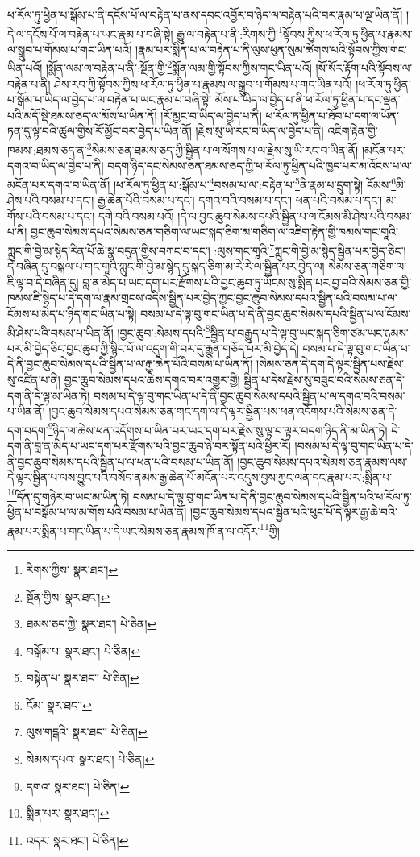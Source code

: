 ཕ་རོལ་ཏུ་ཕྱིན་པ་སྒོམ་པ་ནི་དངོས་པོ་ལ་བརྟེན་པ་ནས་དབང་འབྱོར་བ་ཉིད་ལ་བརྟེན་པའི་བར་རྣམ་པ་ལྔ་ཡིན་ནོ། །དེ་ལ་དངོས་པོ་ལ་བརྟེན་པ་ཡང་རྣམ་པ་བཞི་སྟེ། རྒྱུ་ལ་བརྟེན་པ་ནི་:རིགས་ཀྱི་\footnote{རིགས་ཀྱིས་  སྣར་ཐང་། }སྟོབས་ཀྱིས་ཕ་རོལ་ཏུ་ཕྱིན་པ་རྣམས་ལ་སྒྲུབ་པ་གོམས་པ་གང་ཡིན་པའོ། །རྣམ་པར་སྨིན་པ་ལ་བརྟེན་པ་ནི་ལུས་ཕུན་སུམ་ཚོགས་པའི་སྟོབས་ཀྱིས་གང་ཡིན་པའོ། །སྨོན་ལམ་ལ་བརྟེན་པ་ནི་:སྔོན་གྱི་\footnote{སྔོན་གྱིས་  སྣར་ཐང་། }སྨོན་ལམ་གྱི་སྟོབས་ཀྱིས་གང་ཡིན་པའོ། །སོ་སོར་རྟོག་པའི་སྟོབས་ལ་བརྟེན་པ་ནི། ཤེས་རབ་ཀྱི་སྟོབས་ཀྱིས་ཕ་རོལ་ཏུ་ཕྱིན་པ་རྣམས་ལ་སྒྲུབ་པ་གོམས་པ་གང་ཡིན་པའོ། །ཕ་རོལ་ཏུ་ཕྱིན་པ་སྒོམ་པ་ཡིད་ལ་བྱེད་པ་ལ་བརྟེན་པ་ཡང་རྣམ་པ་བཞི་སྟེ། མོས་པ་ཡིད་ལ་བྱེད་པ་ནི་ཕ་རོལ་ཏུ་ཕྱིན་པ་དང་ལྡན་པའི་མདོ་སྡེ་ཐམས་ཅད་ལ་མོས་པ་ཡིན་ནོ། །རོ་མྱང་བ་ཡིད་ལ་བྱེད་པ་ནི། ཕ་རོལ་ཏུ་ཕྱིན་པ་ཐོབ་པ་དག་ལ་ཡོན་ཏན་དུ་ལྟ་བའི་ཚུལ་གྱིས་རོ་མྱོང་བར་བྱེད་པ་ཡིན་ནོ། །རྗེས་སུ་ཡི་རང་བ་ཡིད་ལ་བྱེད་པ་ནི། འཇིག་རྟེན་གྱི་ཁམས་:ཐམས་ཅད་ན་\footnote{ཐམས་ཅད་ཀྱི་  སྣར་ཐང་།  པེ་ཅིན། }སེམས་ཅན་ཐམས་ཅད་ཀྱི་སྦྱིན་པ་ལ་སོགས་པ་ལ་རྗེས་སུ་ཡི་རང་བ་ཡིན་ནོ། །མངོན་པར་དགའ་བ་ཡིད་ལ་བྱེད་པ་ནི། བདག་ཉིད་དང་སེམས་ཅན་ཐམས་ཅད་ཀྱི་ཕ་རོལ་ཏུ་ཕྱིན་པའི་ཁྱད་པར་མ་འོངས་པ་ལ་མངོན་པར་དགའ་བ་ཡིན་ནོ། །ཕ་རོལ་ཏུ་ཕྱིན་པ་:སྒོམ་པ་\footnote{བསྒོམ་པ་  སྣར་ཐང་།  པེ་ཅིན། }བསམ་པ་ལ་:བརྟེན་པ་\footnote{བསྟེན་པ་  སྣར་ཐང་།  པེ་ཅིན། }ནི་རྣམ་པ་དྲུག་སྟེ། ངོམས་\footnote{ངོམ་  སྣར་ཐང་། }མི་ཤེས་པའི་བསམ་པ་དང་། རྒྱ་ཆེན་པོའི་བསམ་པ་དང་། དགའ་བའི་བསམ་པ་དང་། ཕན་པའི་བསམ་པ་དང་། མ་གོས་པའི་བསམ་པ་དང་། དགེ་བའི་བསམ་པའོ། །དེ་ལ་བྱང་ཆུབ་སེམས་དཔའི་སྦྱིན་པ་ལ་ངོམས་མི་ཤེས་པའི་བསམ་པ་ནི། བྱང་ཆུབ་སེམས་དཔའ་སེམས་ཅན་གཅིག་ལ་ཡང་སྐད་ཅིག་མ་གཅིག་ལ་འཇིག་རྟེན་གྱི་ཁམས་གང་གཱའི་ཀླུང་གི་བྱེ་མ་སྙེད་རིན་པོ་ཆེ་སྣ་བདུན་གྱིས་བཀང་བ་དང་། :ལུས་གང་གཱའི་\footnote{ལུས་གངྒའི་  སྣར་ཐང་།  པེ་ཅིན། }ཀླུང་གི་བྱེ་མ་སྙེད་སྦྱིན་པར་བྱེད་ཅིང་། དེ་བཞིན་དུ་བསྐལ་པ་གང་གཱའི་ཀླུང་གི་བྱེ་མ་སྙེད་དུ་སྐད་ཅིག་མ་རེ་རེ་ལ་སྦྱིན་པར་བྱེད་ལ། སེམས་ཅན་གཅིག་ལ་ཇི་ལྟ་བ་དེ་བཞིན་དུ། བླ་ན་མེད་པ་ཡང་དག་པར་རྫོགས་པའི་བྱང་ཆུབ་ཏུ་ཡོངས་སུ་སྨིན་པར་བྱ་བའི་སེམས་ཅན་གྱི་ཁམས་ཇི་སྙེད་པ་དེ་དག་ལ་རྣམ་གྲངས་འདིས་སྦྱིན་པར་བྱེད་ཀྱང་བྱང་ཆུབ་སེམས་དཔའ་སྦྱིན་པའི་བསམ་པ་ལ་ངོམས་པ་མེད་པ་ཉིད་གང་ཡིན་པ་སྟེ། བསམ་པ་དེ་ལྟ་བུ་གང་ཡིན་པ་དེ་ནི་བྱང་ཆུབ་སེམས་དཔའི་སྦྱིན་པ་ལ་ངོམས་མི་ཤེས་པའི་བསམ་པ་ཡིན་ནོ། །བྱང་ཆུབ་:སེམས་དཔའི་\footnote{སེམས་དཔའ་  སྣར་ཐང་།  པེ་ཅིན། }སྦྱིན་པ་བརྒྱུད་པ་དེ་ལྟ་བུ་ཡང་སྐད་ཅིག་ཙམ་ཡང་ཉམས་པར་མི་བྱེད་ཅིང་བྱང་ཆུབ་ཀྱི་སྙིང་པོ་ལ་འདུག་གི་བར་དུ་རྒྱུན་གཅོད་པར་མི་བྱེད་དེ། བསམ་པ་དེ་ལྟ་བུ་གང་ཡིན་པ་དེ་ནི་བྱང་ཆུབ་སེམས་དཔའི་སྦྱིན་པ་ལ་རྒྱ་ཆེན་པོའི་བསམ་པ་ཡིན་ནོ། །སེམས་ཅན་དེ་དག་དེ་ལྟར་སྦྱིན་པས་རྗེས་སུ་འཛིན་པ་ནི། བྱང་ཆུབ་སེམས་དཔའ་ཆེས་དགའ་བར་འགྱུར་གྱི། སྦྱིན་པ་དེས་རྗེས་སུ་བཟུང་བའི་སེམས་ཅན་དེ་དག་ནི་དེ་ལྟ་མ་ཡིན་ཏེ། བསམ་པ་དེ་ལྟ་བུ་གང་ཡིན་པ་དེ་ནི་བྱང་ཆུབ་སེམས་དཔའི་སྦྱིན་པ་ལ་དགའ་བའི་བསམ་པ་ཡིན་ནོ། །བྱང་ཆུབ་སེམས་དཔའ་སེམས་ཅན་གང་དག་ལ་དེ་ལྟར་སྦྱིན་པས་ཕན་འདོགས་པའི་སེམས་ཅན་དེ་དག་བདག་\footnote{དགའ་  སྣར་ཐང་།  པེ་ཅིན། }ཉིད་ལ་ཆེས་ཕན་འདོགས་པ་ཡིན་པར་ཡང་དག་པར་རྗེས་སུ་ལྟ་བ་ལྟར་བདག་ཉིད་ནི་མ་ཡིན་ཏེ། དེ་དག་ནི་བླ་ན་མེད་པ་ཡང་དག་པར་རྫོགས་པའི་བྱང་ཆུབ་ཉེ་བར་སྟོན་པའི་ཕྱིར་རོ། །བསམ་པ་དེ་ལྟ་བུ་གང་ཡིན་པ་དེ་ནི་བྱང་ཆུབ་སེམས་དཔའི་སྦྱིན་པ་ལ་ཕན་པའི་བསམ་པ་ཡིན་ནོ། །བྱང་ཆུབ་སེམས་དཔའ་སེམས་ཅན་རྣམས་ལས་དེ་ལྟར་སྦྱིན་པ་ལས་བྱུང་པའི་བསོད་ནམས་རྒྱ་ཆེན་པོ་མངོན་པར་འདུས་བྱས་ཀྱང་ལན་དང་རྣམ་པར་:སྨིན་པ་\footnote{སྨིན་པར་  སྣར་ཐང་། }དོན་དུ་གཉེར་བ་ཡང་མ་ཡིན་ཏེ། བསམ་པ་དེ་ལྟ་བུ་གང་ཡིན་པ་དེ་ནི་བྱང་ཆུབ་སེམས་དཔའི་སྦྱིན་པའི་ཕ་རོལ་ཏུ་ཕྱིན་པ་བསྒོམ་པ་ལ་མ་གོས་པའི་བསམ་པ་ཡིན་ནོ། །བྱང་ཆུབ་སེམས་དཔའ་སྦྱིན་པའི་ཕུང་པོ་དེ་ལྟར་རྒྱ་ཆེ་བའི་རྣམ་པར་སྨིན་པ་གང་ཡིན་པ་དེ་ཡང་སེམས་ཅན་རྣམས་ཁོ་ན་ལ་འདོར་\footnote{འདར་  སྣར་ཐང་།  པེ་ཅིན། }གྱི། 